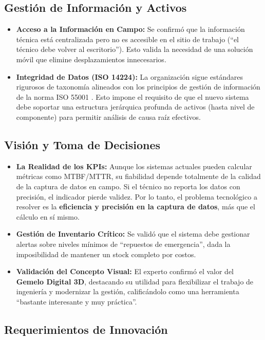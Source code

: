 \documentclass[12pt, a4paper]{article}
\begin{document}
\subsection{Gestión de Información y Activos}

\begin{itemize}
    \item \textbf{Acceso a la Información en Campo:} Se confirmó que la información técnica está centralizada pero no es accesible en el sitio de trabajo (``el técnico debe volver al escritorio''). Esto valida la necesidad de una solución móvil que elimine desplazamientos innecesarios.
    \item \textbf{Integridad de Datos (ISO 14224):} La organización sigue estándares rigurosos de taxonomía alineados con los principios de gestión de información de la norma ISO 55001 \parencite{iso:55001}. Esto impone el requisito de que el nuevo sistema debe soportar una estructura jerárquica profunda de activos (hasta nivel de componente) para permitir análisis de causa raíz efectivos.
\end{itemize}

\subsection{Visión y Toma de Decisiones}

\begin{itemize}
    \item \textbf{La Realidad de los KPIs:} Aunque los sistemas actuales pueden calcular métricas como MTBF/MTTR, su fiabilidad depende totalmente de la calidad de la captura de datos en campo. Si el técnico no reporta los datos con precisión, el indicador pierde validez. Por lo tanto, el problema tecnológico a resolver es la \textbf{eficiencia y precisión en la captura de datos}, más que el cálculo en sí mismo.
    \item \textbf{Gestión de Inventario Crítico:} Se validó que el sistema debe gestionar alertas sobre niveles mínimos de ``repuestos de emergencia'', dada la imposibilidad de mantener un stock completo por costos.
    \item \textbf{Validación del Concepto Visual:} El experto confirmó el valor del \textbf{Gemelo Digital 3D}, destacando su utilidad para flexibilizar el trabajo de ingeniería y modernizar la gestión, calificándolo como una herramienta ``bastante interesante y muy práctica''.
\end{itemize}

\subsection{Requerimientos de Innovación}
\end{document}
